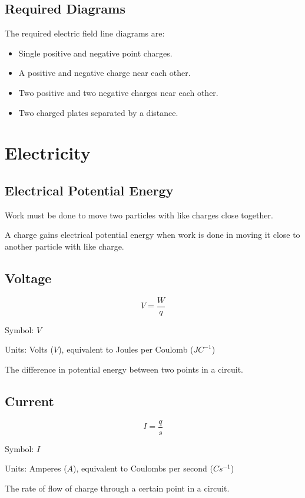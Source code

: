 \documentclass[a4paper,11pt]{report}
\begin{document}
\subsection{Required Diagrams}

The required electric field line diagrams are:

\begin{itemize}
\item Single positive and negative point charges.
\item A positive and negative charge near each other.
\item Two positive and two negative charges near each other.
\item Two charged plates separated by a distance.
\end{itemize}


\section{Electricity}

\subsection{Electrical Potential Energy}

Work must be done to move two particles with like charges close together.

A charge gains electrical potential energy when work is done in moving it close
to another particle with like charge.

\subsection{Voltage}

$$
V = \frac{W}{q}
$$

Symbol: $V$

Units: Volts ($V$), equivalent to Joules per Coulomb ($JC^{-1}$)

The difference in potential energy between two points in a circuit.

\subsection{Current}

$$
I = \frac{q}{s}
$$

Symbol: $I$

Units: Amperes ($A$), equivalent to Coulombs per second ($Cs^{-1}$)

The rate of flow of charge through a certain point in a circuit.
\end{document}
